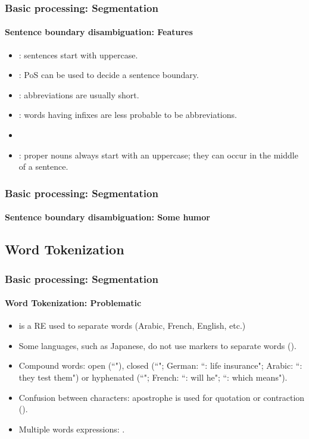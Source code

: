 \documentclass[xcolor=table]{beamer}
\begin{document}
\begin{frame}
\frametitle{Basic processing: Segmentation}
\framesubtitle{Sentence boundary disambiguation: Features} 

\begin{itemize}
	\item {}: sentences start with uppercase.
	\item {}: PoS can be used to decide a sentence boundary.
	\item {}: abbreviations are usually short.
	\item {}: words having infixes are less probable to be abbreviations.
	\item {} 
	\item {}: proper nouns always start with an uppercase; they can occur in the middle of a sentence.
\end{itemize}

\end{frame}

\begin{frame}
\frametitle{Basic processing: Segmentation}
\framesubtitle{Sentence boundary disambiguation: Some humor} 


\begin{center}
\end{center}

\end{frame}

\subsection{Word Tokenization}

\begin{frame}
\frametitle{Basic processing: Segmentation}
\framesubtitle{Word Tokenization: Problematic} 

\begin{itemize}
	\item \expword{/[ ]+/} is a RE used to separate words (Arabic, French, English, etc.)
	\item Some languages, such as Japanese, do not use markers to separate words ().
	\item Compound words: open (``"), closed (``"; German: ``: life insurance"; Arabic: ``: they test them") or hyphenated (``"; French: ``: will he"; ``: which means").
	\item Confusion between characters: apostrophe is used for quotation or contraction ().
	\item Multiple words expressions: .
\end{itemize}

\end{frame}
\end{document}
